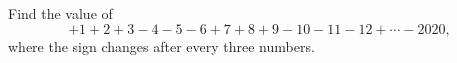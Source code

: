 Find the value of
\[+1+2+3-4-5-6+7+8+9-10-11-12+\cdots-2020,\]
where the sign changes after every three numbers.
